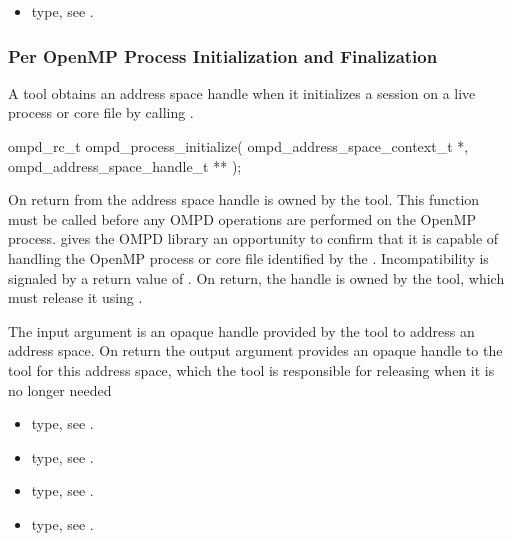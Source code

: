 \crossreferences
\begin{itemize}
	\item {} type, see .
\end{itemize}

\subsubsection{Per OpenMP Process Initialization and Finalization}

\label{subsubsubsec:ompd_process_initialize}
\summary
A tool obtains an address space handle when it initializes
a session on a live process or core file by calling .

\format

\begin{cspecific}
\begin{ompSyntax}
ompd_rc_t ompd_process_initialize(
  ompd_address_space_context_t *,
  ompd_address_space_handle_t **
);
\end{ompSyntax}
\end{cspecific}


\descr
On return from  the address
space handle is owned by the tool. This function must be called before any OMPD operations
are performed on the OpenMP process.  gives the OMPD library an
opportunity to confirm that it is capable of handling the OpenMP process or core file identified by
the . Incompatibility is signaled by a return value of .
On return, the handle is owned by the tool, which must release it using
.

\argdesc
The input argument  is an opaque handle provided by the tool
to address an address space.
On return the output argument  provides an opaque handle to the
tool for this address space, which the tool is responsible for
releasing when it is no longer needed

\crossreferences
\begin{itemize}
  \item {} type, see .
	\item {} type, see .
	\item {} type, see .
	\item {} type, see .
\end{itemize}


